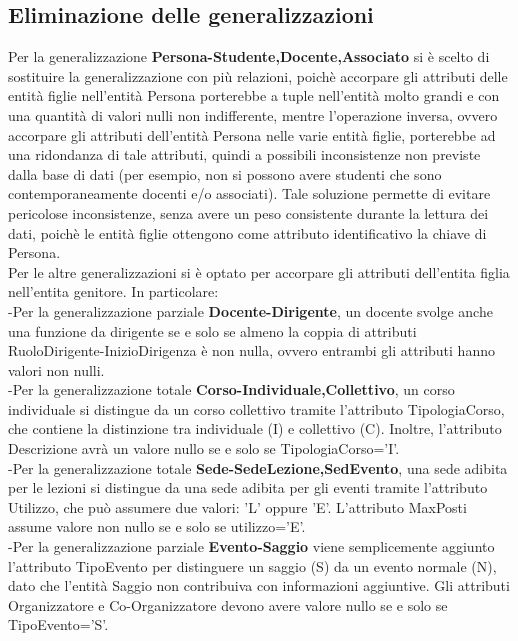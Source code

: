 \documentclass[11pt]{article}
\begin{document}
	\subsection{Eliminazione delle generalizzazioni}
		Per la generalizzazione \textbf{Persona-Studente,Docente,Associato} si è scelto di sostituire la generalizzazione con più relazioni, poichè accorpare gli attributi delle entità figlie nell'entità Persona porterebbe a tuple nell'entità molto grandi e con una quantità di valori nulli non indifferente, mentre l'operazione inversa, ovvero accorpare gli attributi dell'entità Persona nelle varie entità figlie, porterebbe ad una ridondanza di tale attributi, quindi a possibili inconsistenze non previste dalla base di dati (per esempio, non si possono avere studenti che sono contemporaneamente docenti e/o associati). Tale soluzione permette di evitare pericolose inconsistenze, senza avere un peso consistente durante la lettura dei dati, poichè le entità figlie ottengono come attributo identificativo la chiave di Persona.\\
		Per le altre generalizzazioni si è optato per accorpare gli attributi dell'entita figlia nell'entita genitore. In particolare:\\
		-Per la generalizzazione parziale \textbf{Docente-Dirigente}, un docente svolge anche una funzione da dirigente se e solo se almeno la coppia di attributi RuoloDirigente-InizioDirigenza è non nulla, ovvero entrambi gli attributi hanno valori non nulli.\\
		-Per la generalizzazione totale \textbf{Corso-Individuale,Collettivo}, un corso individuale si distingue da un corso collettivo tramite l'attributo TipologiaCorso, che contiene la distinzione tra individuale (I) e collettivo (C). Inoltre, l'attributo Descrizione avrà un valore nullo se e solo se TipologiaCorso='I'.\\
		-Per la generalizzazione totale \textbf{Sede-SedeLezione,SedEvento}, una sede adibita per le lezioni si distingue da una sede adibita per gli eventi tramite l'attributo Utilizzo, che può assumere due valori: 'L' oppure 'E'. L'attributo MaxPosti assume valore non nullo se e solo se utilizzo='E'.\\
		-Per la generalizzazione parziale \textbf{Evento-Saggio} viene semplicemente aggiunto l'attributo TipoEvento per distinguere un saggio (S) da un evento normale (N), dato che l'entità Saggio non contribuiva con informazioni aggiuntive. Gli attributi Organizzatore e Co-Organizzatore devono avere valore nullo se e solo se TipoEvento='S'.\\
\end{document}
